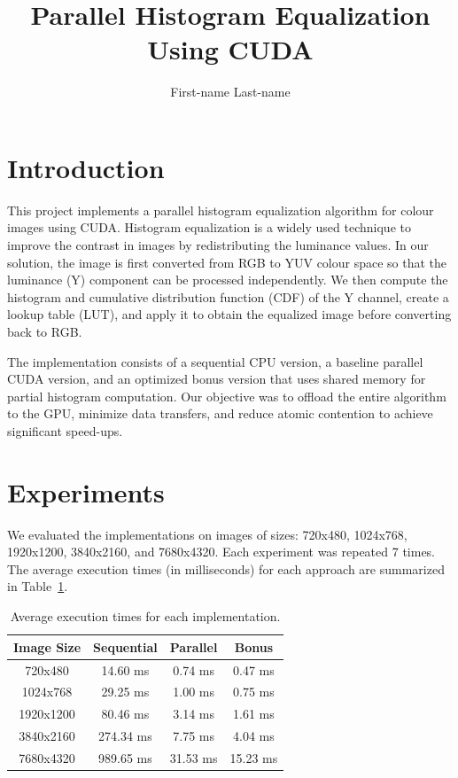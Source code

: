 \documentclass[9pt]{IEEEtran}
\title{\vspace{0ex}
Parallel Histogram Equalization Using CUDA}
\author{First-name Last-name\vspace{-4.0ex}}
\begin{document}
\maketitle

\section{Introduction}
This project implements a parallel histogram equalization algorithm for colour images using CUDA. Histogram equalization is a widely used technique to improve the contrast in images by redistributing the luminance values. In our solution, the image is first converted from RGB to YUV colour space so that the luminance (Y) component can be processed independently. We then compute the histogram and cumulative distribution function (CDF) of the Y channel, create a lookup table (LUT), and apply it to obtain the equalized image before converting back to RGB.

The implementation consists of a sequential CPU version, a baseline parallel CUDA version, and an optimized bonus version that uses shared memory for partial histogram computation. Our objective was to offload the entire algorithm to the GPU, minimize data transfers, and reduce atomic contention to achieve significant speed-ups.

\section{Experiments}
We evaluated the implementations on images of sizes: 720x480, 1024x768, 1920x1200, 3840x2160, and 7680x4320. Each experiment was repeated 7 times. The average execution times (in milliseconds) for each approach are summarized in Table~\ref{tab:avg_times}.

\begin{table}[H]
\centering
\begin{tabular}{|c|c|c|c|}
\hline
Image Size & Sequential & Parallel & Bonus \\ \hline
720x480   & 14.60 ms  & 0.74 ms  & 0.47 ms  \\ \hline
1024x768  & 29.25 ms  & 1.00 ms  & 0.75 ms  \\ \hline
1920x1200 & 80.46 ms  & 3.14 ms  & 1.61 ms  \\ \hline
3840x2160 & 274.34 ms & 7.75 ms  & 4.04 ms  \\ \hline
7680x4320 & 989.65 ms & 31.53 ms & 15.23 ms \\ \hline
\end{tabular}
\caption{Average execution times for each implementation.}
\label{tab:avg_times}
\end{table}
\end{document}
